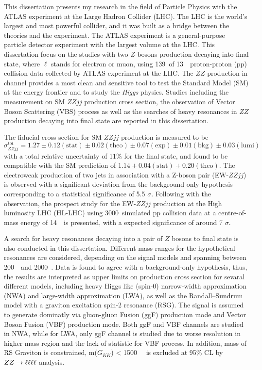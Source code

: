 \begin{enabstract}
This dissertation presents my research in the field of Particle Physics with the ATLAS experiment at the Large Hadron Collider (LHC). 
The LHC is the world's largest and most powerful collider, and it was built as a bridge between the theories and the experiment.
The ATLAS experiment is a general-purpose particle detector experiment with the largest volume at the LHC.
This dissertation focus on the studies with two $Z$ bosons production decaying into \llll final state, where $\mathrm{\ell}$ stands for electron or muon, using 139~\ifb of 13~\tev~proton-proton (pp) collision data collected by ATLAS experiment at the LHC.
The $ZZ$ production in \llll channel provides a most clean and sensitive tool to test the Standard Model (SM) at the energy frontier and to study the \textit{Higgs} physics.
Studies including the measurement on SM $ZZjj$ production cross section, the observation of Vector Boson Scattering (VBS) process as well as the searches of heavy resonances in $ZZ$ production decaying into \llll final state
are reported in this dissertation.

The fiducial cross section for SM $ZZjj$ production is measured to be 
$\sigma_{ZZjj}^{tot} = 1.27 \pm 0.12 (\mathrm{stat}) \pm 0.02 (\mathrm{theo}) \pm 0.07 (\mathrm{exp}) \pm 0.01 (\mathrm{bkg}) \pm 0.03 (\mathrm{lumi})$
with a total relative uncertainty of 11\% for the \llll final state, and found to be compatible with the SM prediction of $1.14 \pm 0.04 (\mathrm{stat}) \pm 0.20 (\mathrm{theo})$.
The electroweak production of two jets in association with a Z-boson pair (EW-$ZZjj$) is observed with
a significant deviation from the background-only hypothesis corresponding to a statistical significance of 5.5 $\sigma$.
Following with the observation, the prospect study for the EW-$ZZjj$ production at the High luminosity LHC (HL-LHC) using 3000~\ifb simulated pp collision data at a centre-of-mass energy of 14~\tev~is presented,
with a expected significance of around 7 $\sigma$.

A search for heavy resonances decaying into a pair of $Z$ bosons to \llll final state is also conducted in this dissertation.
Different mass ranges for the hypothetical resonances are considered, depending on the signal models and spanning between 200~\gev~and 2000~\gev.
Data is found to agree with a background-only hypothesis, thus, the results are interpreted as upper limits on production cross section for sevaral different models, 
including heavy Higgs like (spin-0) narrow-width approximation (NWA) and large-width approximation (LWA), as well as the Randall–Sundrum model with a graviton excitation spin-2 resonance (RSG).
The signal is assumed to generate dominatly via gluon-gluon Fusion (ggF) production mode and Vector Boson Fusion (VBF) production mode.
Both ggF and VBF channels are studied in NWA, while for LWA, only ggF channel is studied due to worse resolution in higher mass region and the lack of statistic for VBF process.
In addition, mass of RS Graviton is constrained, m($G_{KK}$) < 1500~\gev~ is excluded at 95\% CL by $ZZ \rightarrow \ell\ell\ell\ell$ analysis.

\end{enabstract}
